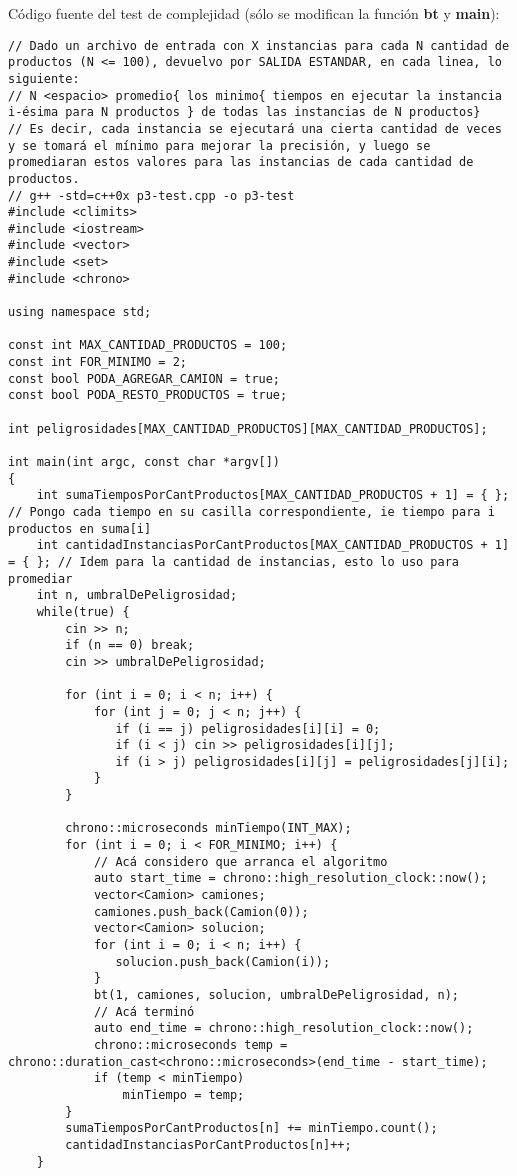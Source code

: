 Código fuente del test de complejidad (sólo se modifican la función \textbf{bt} y \textbf{main}):
\begin{lstlisting}[frame=single]
// Dado un archivo de entrada con X instancias para cada N cantidad de productos (N <= 100), devuelvo por SALIDA ESTANDAR, en cada linea, lo siguiente:
// N <espacio> promedio{ los minimo{ tiempos en ejecutar la instancia i-ésima para N productos } de todas las instancias de N productos}
// Es decir, cada instancia se ejecutará una cierta cantidad de veces y se tomará el mínimo para mejorar la precisión, y luego se promediaran estos valores para las instancias de cada cantidad de productos.
// g++ -std=c++0x p3-test.cpp -o p3-test
#include <climits>
#include <iostream>
#include <vector>
#include <set>
#include <chrono>

using namespace std;

const int MAX_CANTIDAD_PRODUCTOS = 100;
const int FOR_MINIMO = 2;
const bool PODA_AGREGAR_CAMION = true;
const bool PODA_RESTO_PRODUCTOS = true;

int peligrosidades[MAX_CANTIDAD_PRODUCTOS][MAX_CANTIDAD_PRODUCTOS];

int main(int argc, const char *argv[])
{   
    int sumaTiemposPorCantProductos[MAX_CANTIDAD_PRODUCTOS + 1] = { }; // Pongo cada tiempo en su casilla correspondiente, ie tiempo para i productos en suma[i]
    int cantidadInstanciasPorCantProductos[MAX_CANTIDAD_PRODUCTOS + 1] = { }; // Idem para la cantidad de instancias, esto lo uso para promediar
    int n, umbralDePeligrosidad;
    while(true) {
        cin >> n;
        if (n == 0) break;
        cin >> umbralDePeligrosidad;

        for (int i = 0; i < n; i++) {
            for (int j = 0; j < n; j++) {
               if (i == j) peligrosidades[i][i] = 0;
               if (i < j) cin >> peligrosidades[i][j];  
               if (i > j) peligrosidades[i][j] = peligrosidades[j][i];
            }
        }
        
        chrono::microseconds minTiempo(INT_MAX);
        for (int i = 0; i < FOR_MINIMO; i++) {
            // Acá considero que arranca el algoritmo
            auto start_time = chrono::high_resolution_clock::now();
            vector<Camion> camiones;
            camiones.push_back(Camion(0));
            vector<Camion> solucion;
            for (int i = 0; i < n; i++) {
               solucion.push_back(Camion(i)); 
            }
            bt(1, camiones, solucion, umbralDePeligrosidad, n);
            // Acá terminó
            auto end_time = chrono::high_resolution_clock::now();
            chrono::microseconds temp = chrono::duration_cast<chrono::microseconds>(end_time - start_time);
            if (temp < minTiempo)
                minTiempo = temp;
        }
        sumaTiemposPorCantProductos[n] += minTiempo.count();
        cantidadInstanciasPorCantProductos[n]++;
    }
    

\end{lstlisting}
